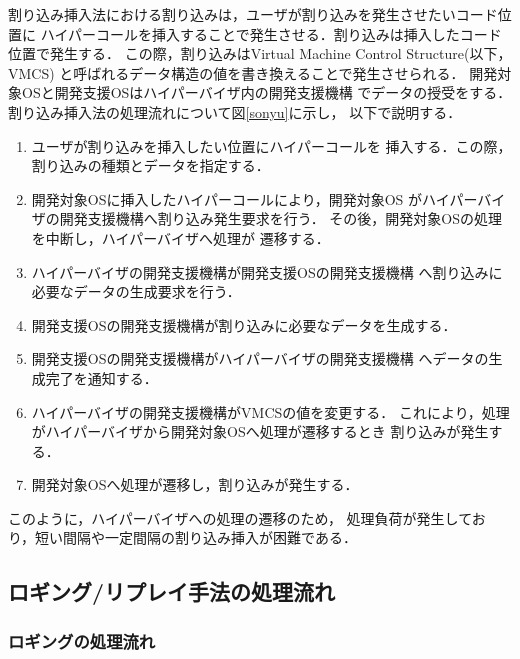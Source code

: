 \documentclass[submit,techreq,noauthor,dvipdfmx]{ipsj}
\begin{document}
割り込み挿入法における割り込みは，ユーザが割り込みを発生させたいコード位置に
ハイパーコールを挿入することで発生させる．割り込みは挿入したコード位置で発生する．
この際，割り込みはVirtual Machine Control Structure(以下，VMCS)
と呼ばれるデータ構造の値を書き換えることで発生させられる．
開発対象OSと開発支援OSはハイパーバイザ内の開発支援機構
でデータの授受をする．
割り込み挿入法の処理流れについて図\ref{sonyu}に示し，
以下で説明する．
\begin{enumerate}
    \item
        ユーザが割り込みを挿入したい位置にハイパーコールを
        挿入する．この際，割り込みの種類とデータを指定する．
    \item 
        開発対象OSに挿入したハイパーコールにより，開発対象OS
        がハイパーバイザの開発支援機構へ割り込み発生要求を行う．
        その後，開発対象OSの処理を中断し，ハイパーバイザへ処理が
        遷移する．
    \item 
        ハイパーバイザの開発支援機構が開発支援OSの開発支援機構
        へ割り込みに必要なデータの生成要求を行う．
    \item 
        開発支援OSの開発支援機構が割り込みに必要なデータを生成する．
    \item 
        開発支援OSの開発支援機構がハイパーバイザの開発支援機構
        へデータの生成完了を通知する．
    \item 
        ハイパーバイザの開発支援機構がVMCSの値を変更する．
        これにより，処理がハイパーバイザから開発対象OSへ処理が遷移するとき
        割り込みが発生する．
    \item 
        開発対象OSへ処理が遷移し，割り込みが発生する．
\end{enumerate}

このように，ハイパーバイザへの処理の遷移のため，
処理負荷が発生しており，短い間隔や一定間隔の割り込み挿入が困難である．

\subsection{ロギング/リプレイ手法の処理流れ}\label{sec:processing_flow_rogging/replay_method}

\subsubsection{ロギングの処理流れ}
\end{document}
